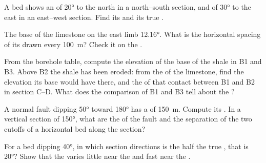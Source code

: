 \begin{exercise}[$\star\star$]\label{exo:b1:cross-sections:6}
A bed shows an  of \ang{20} to the north in a north--south
section, and of \ang{30} to the east in an east--west section. Find its  and its true .
\end{exercise}

\begin{exercise}[$\star\star$]\label{exo:b1:cross-sections:7}
The base of the limestone on the east limb  \ang{12.16}. What is the
horizontal spacing of its  drawn every \qty{100}{m}? Check
it on the .
\end{exercise}

\begin{exercise}[$\star\star$]\label{exo:b1:cross-sections:8}
From the borehole table, compute the elevation of the base of the shale in
B1 and B3. Above B2 the shale has been eroded: from the 
of the limestone, find the elevation its base would have there, and the
 of that contact between B1 and B2 in section C--D. What does
the comparison of B1 and B3 tell about the ?
\end{exercise}

\begin{exercise}[$\star\star$]\label{exo:b1:cross-sections:9}
A normal fault dipping \ang{50} toward \ang{180} has a  of
\qty{150}{m}. Compute its . In a vertical section of  \ang{150},
what are the  of the fault and the separation of the two cutoffs
of a horizontal bed along the section?
\end{exercise}

\begin{exercise}[$\star\star\star$]\label{exo:b1:cross-sections:10}
For a bed dipping \ang{40}, in which section directions is the 
half the true , that is \ang{20}? Show that the  varies
little near the  and fast near the .
\end{exercise}

